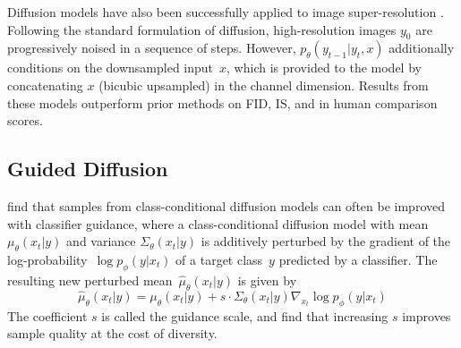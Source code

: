 \documentclass{article}
\begin{document}
Diffusion models have also been successfully applied to image super-resolution \cite{improved,sr3}. Following the standard formulation of diffusion, high-resolution images $y_0$ are progressively noised in a sequence of steps. However, $p_\theta(y_{t-1} | y_t, x)$ additionally conditions on the downsampled input~$x$, which is provided to the model by concatenating $x$ (bicubic upsampled) in the channel dimension. Results from these models outperform prior methods on FID, IS, and in human comparison scores.

\subsection{Guided Diffusion}
\label{sec:guideddiffusion}

\citet{sotapaper} find that samples from class-conditional diffusion models can often be improved with classifier guidance, where a class-conditional diffusion model with mean~$\mu_{\theta}(x_t|y)$ and variance $\Sigma_{\theta}(x_t|y)$ is additively perturbed by the gradient of the log-probability~$\log p_{\phi}(y|x_t)$ of a target class~$y$ predicted by a classifier. The resulting new perturbed mean~$\hat{\mu}_{\theta}(x_t|y)$ is given by 
%
$$\hat{\mu}_{\theta}(x_t|y) = \mu_{\theta}(x_t|y) + s \cdot \Sigma_{\theta}(x_t|y) \nabla_{x_t} \log p_{\phi}(y|x_t)$$
%
The coefficient $s$ is called the guidance scale, and \citet{sotapaper} find that increasing $s$ improves sample quality at the cost of diversity.
\end{document}
